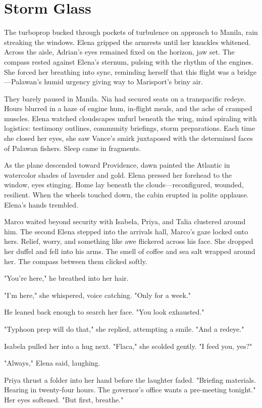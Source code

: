 \chapter{Storm Glass}

The turboprop bucked through pockets of turbulence on approach to Manila, rain streaking the windows. Elena gripped the armrests until her knuckles whitened. Across the aisle, Adrian's eyes remained fixed on the horizon, jaw set. The compass rested against Elena's sternum, pulsing with the rhythm of the engines. She forced her breathing into sync, reminding herself that this flight was a bridge—Palawan's humid urgency giving way to Marisport's briny air.

They barely paused in Manila. Nia had secured seats on a transpacific redeye. Hours blurred in a haze of engine hum, in-flight meals, and the ache of cramped muscles. Elena watched cloudscapes unfurl beneath the wing, mind spiraling with logistics: testimony outlines, community briefings, storm preparations. Each time she closed her eyes, she saw Vance's smirk juxtaposed with the determined faces of Palawan fishers. Sleep came in fragments.

As the plane descended toward Providence, dawn painted the Atlantic in watercolor shades of lavender and gold. Elena pressed her forehead to the window, eyes stinging. Home lay beneath the clouds—reconfigured, wounded, resilient. When the wheels touched down, the cabin erupted in polite applause. Elena's hands trembled.

Marco waited beyond security with Isabela, Priya, and Talia clustered around him. The second Elena stepped into the arrivals hall, Marco's gaze locked onto hers. Relief, worry, and something like awe flickered across his face. She dropped her duffel and fell into his arms. The smell of coffee and sea salt wrapped around her. The compass between them clicked softly.

"You're here," he breathed into her hair.

"I'm here," she whispered, voice catching. "Only for a week."

He leaned back enough to search her face. "You look exhausted."

"Typhoon prep will do that," she replied, attempting a smile. "And a redeye."

Isabela pulled her into a hug next. "Flaca," she scolded gently. "I feed you, yes?"

"Always," Elena said, laughing.

Priya thrust a folder into her hand before the laughter faded. "Briefing materials. Hearing in twenty-four hours. The governor's office wants a pre-meeting tonight." Her eyes softened. "But first, breathe."


